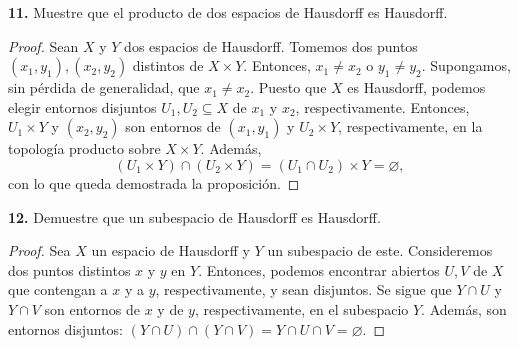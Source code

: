 \documentclass{article}
\begin{document}
\begin{mybox}
\textbf{11. } Muestre que el producto de dos espacios de Hausdorff es Hausdorff. 	
\end{mybox}	
\begin{proof}
	Sean $X$ y $Y$ dos espacios de Hausdorff. Tomemos dos puntos $(x_{1}, y_{1}), (x_{2}, y_{2})$ distintos de $X \times Y$. Entonces, $x_{1} \neq x_{2}$ o $y_{1} \neq y_{2}$. Supongamos, sin pérdida de generalidad, que $x_{1} \neq x_{2}$. Puesto que $X$ es Hausdorff, podemos elegir entornos disjuntos $U_{1}, U_{2} \subseteq X$ de $x_{1}$ y $x_{2}$, respectivamente.  Entonces, $U_{1} \times Y$ y $(x_{2}, y_{2})$ son entornos de $(x_{1}, y_{1})$ y $U_{2} \times Y$, respectivamente, en la topología producto sobre $X \times Y$. Además, 
	$$ \left( U_{1} \times Y \right) \cap \left( U_{2} \times Y \right) =   \left( U_{1} \cap U_{2} \right) \times Y = \varnothing, $$
	con lo que queda demostrada la proposición. 
\end{proof}

\begin{mybox}
	\textbf{12. } Demuestre que un subespacio de Hausdorff es Hausdorff. 
\end{mybox}	
\begin{proof}
	Sea $X$ un espacio de Hausdorff y $Y$ un subespacio de este. Consideremos dos puntos distintos $x$ y $y$ en $Y$. Entonces, podemos encontrar abiertos $U, V$ de $X$ que contengan a $x$ y a $y$, respectivamente, y sean disjuntos. Se sigue que $Y \cap U$ y $Y \cap V$ son entornos de $x$ y de $y$, respectivamente, en el subespacio $Y$. Además, son entornos disjuntos: $(Y \cap U) \cap (Y \cap V) = Y \cap U \cap V = \varnothing.$
\end{proof}
\end{document}
